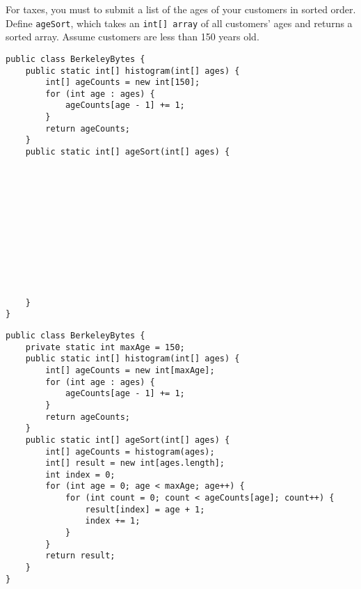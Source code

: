 \begin{blocksection}
\question For taxes, you must to submit a list of the ages of your customers in
sorted order. Define \lstinline$ageSort$, which takes an
\lstinline$int[] array$ of all customers' ages and returns a sorted array.
Assume customers are less than 150 years old.

\ifprintanswers
\else
\begin{lstlisting}
public class BerkeleyBytes {
    public static int[] histogram(int[] ages) {
        int[] ageCounts = new int[150];
        for (int age : ages) {
            ageCounts[age - 1] += 1;
        }
        return ageCounts;
    }
    public static int[] ageSort(int[] ages) {












    }
}
\end{lstlisting}
\fi

\begin{solution}
\begin{lstlisting}
public class BerkeleyBytes {
    private static int maxAge = 150;
    public static int[] histogram(int[] ages) {
        int[] ageCounts = new int[maxAge];
        for (int age : ages) {
            ageCounts[age - 1] += 1;
        }
        return ageCounts;
    }
    public static int[] ageSort(int[] ages) {
        int[] ageCounts = histogram(ages);
        int[] result = new int[ages.length];
        int index = 0;
        for (int age = 0; age < maxAge; age++) {
            for (int count = 0; count < ageCounts[age]; count++) {
                result[index] = age + 1;
                index += 1;
            }
        }
        return result;
    }
}
\end{lstlisting}
\end{solution}
\end{blocksection}
